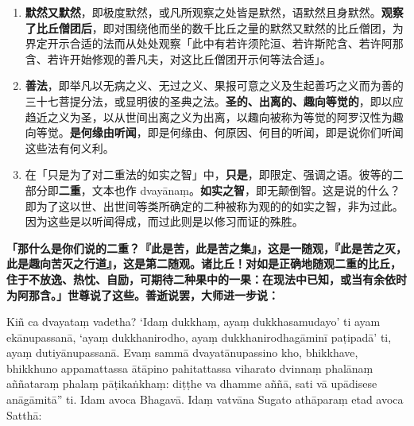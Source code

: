 \begin{enumerate}\item \textbf{默然又默然}，即极度默然，或凡所观察之处皆是默然，语默然且身默然。\textbf{观察了比丘僧团后}，即对围绕他而坐的数千比丘之量的默然又默然的比丘僧团，为界定开示合适的法而从处处观察「此中有若许须陀洹、若许斯陀含、若许阿那含、若许开始修观的善凡夫，对这比丘僧团开示何等法合适」。
\item \textbf{善法}，即举凡以无病之义、无过之义、果报可意之义及生起善巧之义而为善的三十七菩提分法，或显明彼的圣典之法。\textbf{圣的、出离的、趣向等觉的}，即以应趋近之义为圣，以从世间出离之义为出离，以趣向被称为等觉的阿罗汉性为趣向等觉。\textbf{是何缘由听闻}，即是何缘由、何原因、何目的听闻，即是说你们听闻这些法有何义利。
\item 在「只是为了对二重法的如实之智」中，\textbf{只是}，即限定、强调之语。彼等的二部分即\textbf{二重}，文本也作 dvayānaṃ。\textbf{如实之智}，即无颠倒智。这是说的什么？即为了这以世、出世间等类所确定的二种被称为观的的如实之智，非为过此。因为这些是以听闻得成，而过此则是以修习而证的殊胜。\end{enumerate}

\textbf{「那什么是你们说的二重？『此是苦，此是苦之集』，这是一随观，『此是苦之灭，此是趣向苦灭之行道』，这是第二随观。诸比丘！对如是正确地随观二重的比丘，住于不放逸、热忱、自励，可期待二种果中的一果：在现法中已知，或当有余依时为阿那含。」世尊说了这些。善逝说罢，大师进一步说：}

Kiñ ca dvayataṃ vadetha? ‘Idaṃ dukkhaṃ, ayaṃ dukkhasamudayo’ ti ayam ekānupassanā, ‘ayaṃ dukkhanirodho, ayaṃ dukkhanirodhagāminī paṭipadā’ ti, ayaṃ dutiyānupassanā. Evaṃ sammā dvayatānupassino kho, bhikkhave, bhikkhuno appamattassa ātāpino pahitattassa viharato dvinnaṃ phalānaṃ aññataraṃ phalaṃ pāṭikaṅkhaṃ: diṭṭhe va dhamme aññā, sati vā upādisese anāgāmitā” ti. Idam avoca Bhagavā. Idaṃ vatvāna Sugato athāparaṃ etad avoca Satthā:

